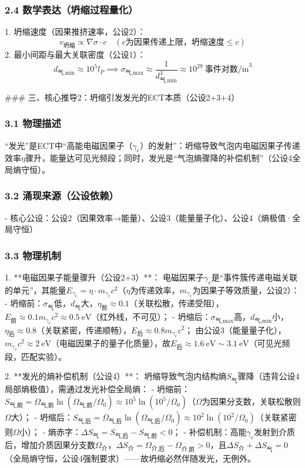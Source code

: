 \documentclass{article}
\begin{document}
\subsubsection{2.4 数学表达（坍缩过程量化）}
1. 坍缩速度（因果推挤速率，公设2）：  
   \[
   v_{\text{坍缩}} \propto \nabla\sigma \cdot c \quad (c为因果传递上限，坍缩速度≤c)
   \]
2. 最小间距与最大关联密度（公设1）：  
   \[
   d_{\text{气,min}} \approx 10^5 l_P \implies \sigma_{\text{气,max}} \approx \frac{1}{d_{\text{气,min}}^3} \approx 10^{29}\ \text{事件对数/m}^3
   \]


### 三、核心推导2：坍缩引发发光的ECT本质（公设2+3+4）
\subsubsection{3.1 物理描述}
“发光”是ECT中“高能电磁因果子（$\gamma_e$）的发射”：坍缩导致气泡内电磁因果子传递效率$\eta$骤升，能量达可见光频段；同时，发光是“气泡熵骤降的补偿机制”（公设4全局熵守恒）。

\subsubsection{3.2 涌现来源（公设依赖）}
- 核心公设：公设2（因果效率→能量）、公设3（能量量子化）、公设4（熵极值·全局守恒）

\subsubsection{3.3 物理机制}
1. **电磁因果子能量骤升（公设2+3）**：  
   电磁因果子$\gamma_e$是“事件簇传递电磁关联的单元”，其能量$E_{\gamma_e} = \eta \cdot m_{\gamma_e} c^2$（$\eta$为传递效率，$m_{\gamma_e}$为因果子等效质量，公设2）：  
   - 坍缩前：$\sigma_{\text{气}}$低，$d_{\text{气}}$大，$\eta_{\text{前}} \approx 0.1$（关联松散，传递受阻），$E_{\text{前}} \approx 0.1 m_{\gamma_e} c^2 \approx 0.5\ \text{eV}$（红外线，不可见）；  
   - 坍缩后：$\sigma_{\text{气,max}}$高，$d_{\text{气,min}}$小，$\eta_{\text{后}} \approx 0.8$（关联紧密，传递顺畅），$E_{\text{后}} \approx 0.8 m_{\gamma_e} c^2$；  
   由公设3（能量量子化），$m_{\gamma_e} c^2 \approx 2\ \text{eV}$（电磁因果子的量子化质量），故$E_{\text{后}} \approx 1.6\ \text{eV} \sim 3.1\ \text{eV}$（可见光频段，匹配实验）。

2. **发光的熵补偿机制（公设4）**：  
   坍缩导致气泡内结构熵$S_{\text{气}}$骤降（违背公设4局部熵极值），需通过发光补偿全局熵：  
   - 坍缩前：$S_{\text{气,前}} = \Omega_{\text{气,前}} \ln(\Omega_{\text{气,前}}/\Omega_0) \approx 10^5 \ln(10^5/\Omega_0)$（$\Omega$为因果分支数，关联松散则$\Omega$大）；  
   - 坍缩后：$S_{\text{气,后}} = \Omega_{\text{气,后}} \ln(\Omega_{\text{气,后}}/\Omega_0) \approx 10^2 \ln(10^2/\Omega_0)$（关联紧密则$\Omega$小）；  
   - 熵赤字：$\Delta S_{\text{气}} = S_{\text{气,后}} - S_{\text{气,前}} < 0$；  
   - 补偿机制：高能$\gamma_e$发射到介质后，增加介质因果分支数$\Omega_{\text{介}}$，$\Delta S_{\text{介}} = \Omega_{\text{介,后}} - \Omega_{\text{介,前}} > 0$，且$\Delta S_{\text{介}} + \Delta S_{\text{气}} = 0$（全局熵守恒，公设4强制要求）——故坍缩必然伴随发光，无例外。
\end{document}
